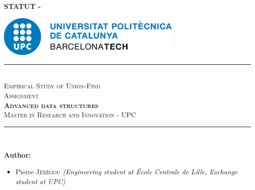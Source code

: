 \pagestyle{plain}
\pagecolor{white}

\begin{center}
    \color{red!50!white}
    \textbf{\huge{STATUT - \documentStatus}}
\end{center}

\vfill


\color{black}
\begin{center}
    \includegraphics[height=2cm]{images/logos/upc_logo.jpeg} \\
    \vfill
    \rule{\linewidth}{0.5mm} \\[1cm]
    {\Huge \textsc{\textcolor{fib_red}{Empirical Study of Union-Find}}}\\[1cm]
    {\Large \textsc{Assignment}}\\[0.4cm]
    {\huge \textsc{\textbf{Advanced data structures}}}\\[1cm]
    {\Large \textsc{Master in Research and Innovation - UPC}}\\[0.4cm]
    \rule{\linewidth}{0.5mm} \\[1.5cm]
\end{center}

\vfill

\textbf{Author:}
\begin{itemize}
\item Pierre \textsc{Jézégou}\newline
\textit{(Engineering student at École Centrale de Lille, Exchange student at UPC)}
\end{itemize}

\newpage
\color{black}
\pagecolor{white}
\pagestyle{fancy}